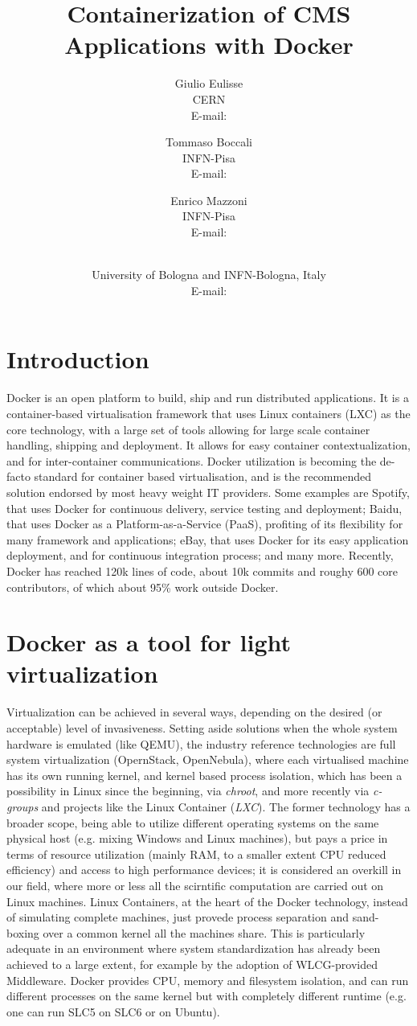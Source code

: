 \documentclass{PoS}
\title{Containerization of CMS Applications with Docker}
\author{Giulio Eulisse\\
        CERN\\
        E-mail: \email{Giulio.Eulisse@cern.ch}}
\author{Tommaso Boccali\\
        INFN-Pisa\\
        E-mail: \email{Tommaso.Boccali@pi.infn.it}}
\author{Enrico Mazzoni\\
        INFN-Pisa\\
        E-mail: \email{enrico.mazzoni@pi.infn.it}}
\author{\speaker{Daniele Bonacorsi}\\
        University of Bologna and INFN-Bologna, Italy\\
        E-mail: \email{daniele.bonacorsi@unibo.it}}
\begin{document}
\section{Introduction}

Docker is an open platform to build, ship and run distributed applications. It is a container-based virtualisation framework that uses Linux containers (LXC) as the core technology, with a large set of tools allowing for large scale container handling, shipping and deployment. It allows for easy container contextualization, and for inter-container communications. Docker utilization is becoming the de-facto standard for container based virtualisation, and is the recommended solution endorsed by most heavy weight IT providers. Some examples are Spotify, that uses Docker for continuous delivery, service testing and deployment; Baidu, that uses Docker as a Platform-as-a-Service (PaaS), profiting of its flexibility for many framework and applications; eBay, that uses Docker for its easy application deployment, and for continuous integration process; and many more. Recently, Docker has reached 120k lines of code, about 10k commits and roughy 600 core contributors, of which about 95\% work outside Docker.

\section{Docker as a tool for light virtualization}

Virtualization can be achieved in several ways, depending on the desired (or acceptable) level of invasiveness. Setting aside solutions when the whole system hardware is emulated (like QEMU), the industry reference technologies are full system virtualization (OpernStack, OpenNebula), where each virtualised machine has its own running kernel, and kernel based process isolation, which has been a possibility in Linux since the beginning, via \emph{chroot}, and more recently via \emph{c-groups} and projects like the Linux Container (\emph{LXC}). The former technology has a broader scope, being able to utilize different operating systems on the same physical host (e.g. mixing Windows and Linux machines), but pays a price in terms of resource utilization (mainly RAM, to a smaller extent CPU reduced efficiency) and access to high performance devices; it is considered an overkill in our field, where more or less all the scirntific computation are carried out on Linux machines. Linux Containers, at the heart of the Docker technology, instead of simulating complete machines, just provede process separation and sand-boxing over a common kernel all the machines share. This is particularly adequate in an environment where system standardization has already been achieved to a large extent, for example by the adoption of WLCG-provided Middleware.
Docker provides CPU, memory and filesystem isolation, and can run different processes on the same kernel but with completely different runtime (e.g. one can run SLC5 on SLC6 or on Ubuntu).
\end{document}
